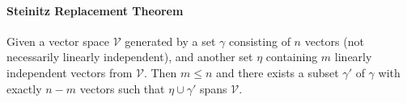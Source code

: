\paragraph{Steinitz Replacement Theorem}

\begin{thm}
\label{thm:Steinitz}
Given a vector space $\mathcal{V}$ generated by a set $\mathcal{\gamma}$ consisting of $n$ vectors (not necessarily linearly independent), and another set $\mathcal{\eta}$ containing $m$ linearly independent vectors from $\mathcal{V}$. Then $m \leq n$ and there exists a subset $\mathcal{\gamma'}$ of $\mathcal{\gamma}$ with exactly $n-m$ vectors such that $\mathcal{\eta} \cup \mathcal{\gamma'}$ spans $\mathcal{V}$.
\end{thm}
